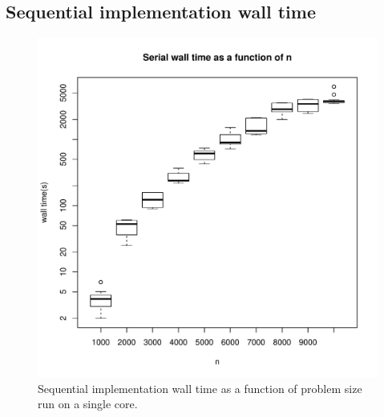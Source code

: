 \documentclass{article}
\begin{document}
\subsection{Sequential implementation wall time}
\begin{figure}[H]
  \begin{center}
    \includegraphics[width=12cm]{../analysis/serial_walltime.pdf}
  \end{center}
  \caption{Sequential implementation wall time as a function of problem size run on a single core.}
  \label{serial_walltime}
\end{figure}
\end{document}
